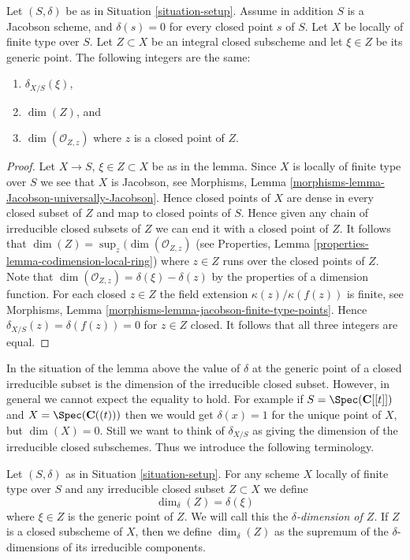 \begin{lemma}
\label{lemma-delta-is-dimension}
Let $(S, \delta)$ be as in Situation \ref{situation-setup}.
Assume in addition $S$ is a Jacobson scheme, and $\delta(s) = 0$ for every
closed point $s$ of $S$. Let $X$ be locally of finite type over $S$.
Let $Z \subset X$ be an integral closed subscheme and let
$\xi \in Z$ be its generic point. The following integers are the same:
\begin{enumerate}
\item $\delta_{X/S}(\xi)$,
\item $\dim(Z)$, and
\item $\dim(\mathcal{O}_{Z, z})$ where $z$ is a closed point of $Z$.
\end{enumerate}
\end{lemma}

\begin{proof}
Let $X \to S$, $\xi \in Z \subset X$ be as in the lemma.
Since $X$ is locally of finite type over $S$ we see that
$X$ is Jacobson, see
Morphisms, Lemma \ref{morphisms-lemma-Jacobson-universally-Jacobson}.
Hence closed points of $X$ are dense in every closed subset of $Z$
and map to closed points of $S$. Hence given any chain
of irreducible closed subsets of $Z$ we can end it with a closed point of $Z$.
It follows that $\dim(Z) = \sup_z(\dim(\mathcal{O}_{Z, z})$
(see Properties, Lemma \ref{properties-lemma-codimension-local-ring})
where $z \in Z$ runs over the closed points of $Z$.
Note that $\dim(\mathcal{O}_{Z, z}) = \delta(\xi) - \delta(z)$
by the properties of a dimension function.
For each closed $z \in Z$ the field extension
$\kappa(z)/\kappa(f(z))$ is finite, see Morphisms,
Lemma \ref{morphisms-lemma-jacobson-finite-type-points}.
Hence $\delta_{X/S}(z) = \delta(f(z)) = 0$ for $z \in Z$ closed.
It follows that all three integers are equal.
\end{proof}

\noindent
In the situation of the lemma above the
value of $\delta$ at the generic point of a closed irreducible subset
is the dimension of the irreducible closed subset.
However, in general we cannot expect the equality to hold.
For example if $S = \Spec(\mathbf{C}[[t]])$ and
$X = \Spec(\mathbf{C}((t)))$ then we would get
$\delta(x) = 1$ for the unique point of $X$, but $\dim(X) = 0$.
Still we want to think of $\delta_{X/S}$ as giving the
dimension of the irreducible closed subschemes. Thus we introduce
the following terminology.

\begin{definition}
\label{definition-delta-dimension}
Let $(S, \delta)$ as in Situation \ref{situation-setup}.
For any scheme $X$ locally of finite type over $S$
and any irreducible closed subset $Z \subset X$ we define
$$
\dim_\delta(Z) = \delta(\xi)
$$
where $\xi \in Z$ is the generic point of $Z$.
We will call this the {\it $\delta$-dimension of $Z$}.
If $Z$ is a closed subscheme of $X$, then we define
$\dim_\delta(Z)$ as the supremum of the $\delta$-dimensions
of its irreducible components.
\end{definition}







